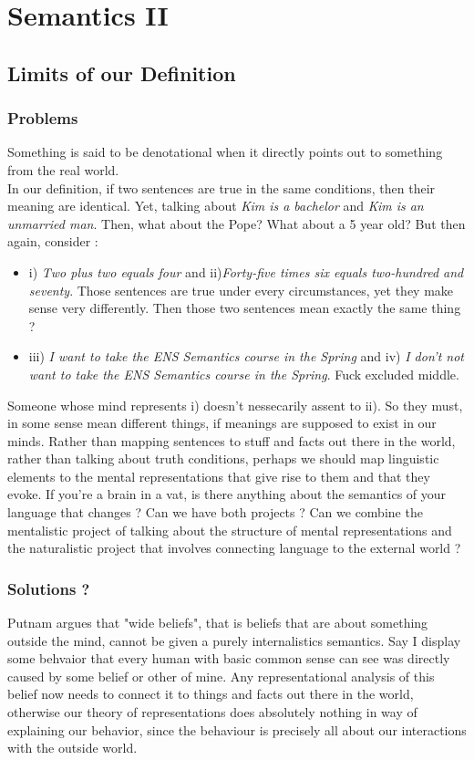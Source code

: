 \documentclass{cours}
\begin{document}
\section[Class 6\! : 16/11]{Semantics II}
\subsection{Limits of our Definition}
\subsubsection{Problems}
Something is said to be denotational when it directly points out to something from the real world. \\

In our definition, if two sentences are true in the same conditions, then their meaning are identical.
Yet, talking about \textsl{Kim is a bachelor} and \textsl{Kim is an unmarried man}. Then, what about the Pope? What about a 5 year old?
But then again, consider\! :
\begin{itemize}
    \item i) \textsl{Two plus two equals four} and ii)\textsl{Forty-five times six equals two-hundred and seventy}. Those sentences are true under every circumstances, yet they make sense very differently. Then those two sentences mean exactly the same thing ?
    \item iii) \textsl{I want to take the ENS Semantics course in the Spring} and iv) \textsl{I don't not want to take the ENS Semantics course in the Spring}. Fuck excluded middle.
\end{itemize}
Someone whose mind represents i) doesn't nessecarily assent to ii). So they must, in some sense mean different things, if meanings are supposed to exist in our minds. Rather than mapping sentences to stuff and facts out there in the world, rather than talking about truth conditions, perhaps we should map linguistic elements to the mental representations that give rise to them and that they evoke. If you're a brain in a vat, is there anything about the semantics of your language that changes ? Can we have both projects ? Can we combine the mentalistic project of talking about the structure of mental representations and the naturalistic project that involves connecting language to the external world ?

\subsubsection{Solutions ?}
Putnam argues that "wide beliefs", that is beliefs that are about something outside the mind, cannot be given a purely internalistics semantics. Say I display some behvaior that every human with basic common sense can see was directly caused by some belief or other of mine. Any representational analysis of this belief now needs to connect it to things and facts out there in the world, otherwise our theory of representations does absolutely nothing in way of explaining our behavior, since the behaviour is precisely all about our interactions with the outside world.\\
\end{document}
